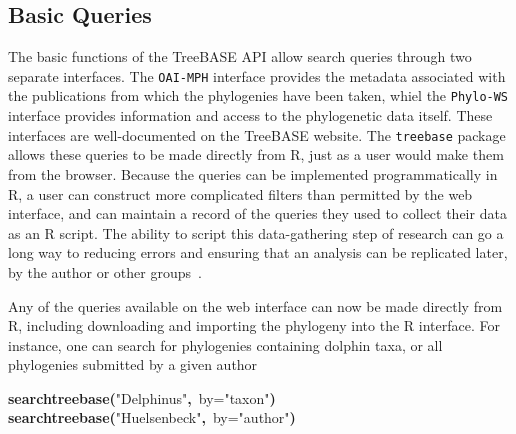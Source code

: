\documentclass[authoryear, preprint]{elsarticle}
\makeatletter
\newcommand{\hlfunctioncall}[1]{\textcolor[rgb]{.5,0,.33}{\textbf{#1}}}%
\newcommand{\hlstring}[1]{\textcolor[rgb]{.6,.6,1}{#1}}%
\newcommand{\hlkeyword}[1]{\textbf{#1}}%
\newcommand{\hlargument}[1]{\textcolor[rgb]{.69,.25,.02}{#1}}%
\newcommand{\hlstd}[1]{\textcolor[rgb]{0,0,0}{#1}}%
\newenvironment{kframe}{%
 \def\FrameCommand##1{\hskip\@totalleftmargin \hskip-\fboxsep
 \colorbox{shadecolor}{##1}\hskip-\fboxsep
     \hskip-\linewidth \hskip-\@totalleftmargin \hskip\columnwidth}%
 \MakeFramed {\advance\hsize-\width
   \@totalleftmargin\z@ \linewidth\hsize
   \@setminipage}}%
 {\par\unskip\endMakeFramed}
\newenvironment{knitrout}{}{} %
\makeatother
\begin{document}
\subsection{Basic Queries}
\begin{knitrout}
\color{fgcolor}
\end{knitrout}


The basic functions of the TreeBASE API allow search queries 
through two separate interfaces.  The \texttt{OAI-MPH} interface 
provides the metadata associated with the publications from which the 
phylogenies have been taken, whiel the \texttt{Phylo-WS} interface provides
information and access to the phylogenetic data itself.
These interfaces are well-documented on the TreeBASE website.
The \texttt{treebase} package allows these queries to be made directly from R,
just as a user would make them from the browser.
Because the queries can be implemented programmatically in R,
a user can construct more complicated filters than permitted by the web interface, 
and can maintain a record of the queries they used to collect their data as an R script.  
The ability to script this data-gathering step of research can go a long way to reducing errors
and ensuring that an analysis can be replicated later, by the author or other groups~\citep{Peng2011a}.  

Any of the queries available on the web interface can now be made directly from R,
including downloading and importing the phylogeny into the R interface.  
For instance, one can search for phylogenies containing dolphin taxa,
or all phylogenies submitted by a given author
\begin{knitrout}
\color{fgcolor}\begin{kframe}
\begin{flushleft}
\ttfamily\noindent
\hlfunctioncall{search\usebox{\hlnormalsizeboxunderscore}treebase}\hlkeyword{(}\hlstring{"{}Delphinus"{}}\hlkeyword{,}{\ }\hlargument{by}\hlargument{=}\hlstring{"{}taxon"{}}\hlkeyword{)}\hspace*{\fill}\\
\hlstd{}\hlfunctioncall{search\usebox{\hlnormalsizeboxunderscore}treebase}\hlkeyword{(}\hlstring{"{}Huelsenbeck"{}}\hlkeyword{,}{\ }\hlargument{by}\hlargument{=}\hlstring{"{}author"{}}\hlkeyword{)}\mbox{}
\normalfont
\end{flushleft}
\end{kframe}
\end{knitrout}
\end{document}
